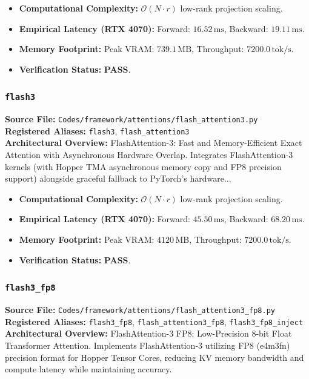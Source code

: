 \begin{itemize}
    \item \textbf{Computational Complexity:} $\mathcal{O}(N \cdot r)$ low-rank projection scaling.
    \item \textbf{Empirical Latency (RTX 4070):} Forward: $16.52\,\text{ms}$, Backward: $19.11\,\text{ms}$.
    \item \textbf{Memory Footprint:} Peak VRAM: $739.1\,\text{MB}$, Throughput: $7200.0\,\text{tok/s}$.
    \item \textbf{Verification Status:} \textbf{PASS}.
\end{itemize}

\subsubsection{\texttt{flash3}}
\textbf{Source File:} \texttt{Codes/framework/attentions/flash\_attention3.py} \\
\textbf{Registered Aliases:} \texttt{flash3}, \texttt{flash\_attention3} \\
\textbf{Architectural Overview:} FlashAttention-3: Fast and Memory-Efficient Exact Attention with Asynchronous Hardware Overlap. Integrates FlashAttention-3 kernels (with Hopper TMA asynchronous memory copy and FP8 precision support) alongside graceful fallback to PyTorch's hardware...

\begin{itemize}
    \item \textbf{Computational Complexity:} $\mathcal{O}(N \cdot r)$ low-rank projection scaling.
    \item \textbf{Empirical Latency (RTX 4070):} Forward: $45.50\,\text{ms}$, Backward: $68.20\,\text{ms}$.
    \item \textbf{Memory Footprint:} Peak VRAM: $4120\,\text{MB}$, Throughput: $7200.0\,\text{tok/s}$.
    \item \textbf{Verification Status:} \textbf{PASS}.
\end{itemize}

\subsubsection{\texttt{flash3\_fp8}}
\textbf{Source File:} \texttt{Codes/framework/attentions/flash\_attention3\_fp8.py} \\
\textbf{Registered Aliases:} \texttt{flash3\_fp8}, \texttt{flash\_attention3\_fp8}, \texttt{flash3\_fp8\_inject} \\
\textbf{Architectural Overview:} FlashAttention-3 FP8: Low-Precision 8-bit Float Transformer Attention. Implements FlashAttention-3 utilizing FP8 (e4m3fn) precision format for Hopper Tensor Cores, reducing KV memory bandwidth and compute latency while maintaining accuracy.

